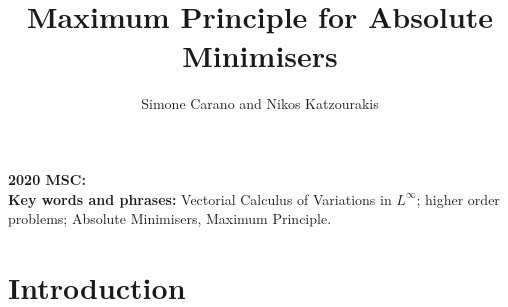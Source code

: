 \documentclass[a4paper,11pt]{article}
\title{Maximum Principle for Absolute Minimisers
}
\author{
Simone Carano and Nikos Katzourakis }
\numberwithin{equation}{section}
\theoremstyle{definition}
\begin{document}
\maketitle

\begin{abstract} 

\end{abstract}
{\bf 2020 MSC:}\\
{\bf Key words and phrases:} Vectorial Calculus of Variations in $L^\infty$; higher order problems; Absolute Minimisers, Maximum Principle.

\section{Introduction}\label{sec:introduction}
\end{document}
